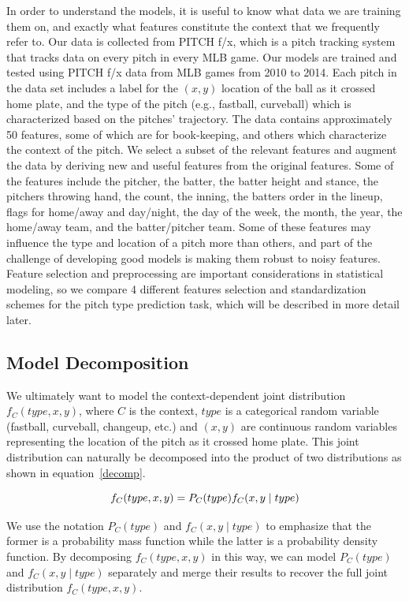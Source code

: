 \documentclass{article}
\begin{document}
In order to understand the models, it is useful to know what data we are training them on, and exactly what features constitute the context that we frequently refer to.  Our data is collected from PITCH f/x, which is a pitch tracking system that tracks data on every pitch in every MLB game. Our models are trained and tested using PITCH f/x data from MLB games from 2010 to 2014. Each pitch in the data set includes a label for the $(x,y)$ location of the ball as it crossed home plate, and the type of the pitch (e.g., fastball, curveball) which is characterized based on the pitches' trajectory.  The data contains approximately 50 features, some of which are for book-keeping, and others which characterize the context of the pitch.  We select a subset of the relevant features and augment the data by deriving new and useful features from the original features.  Some of the features include the pitcher, the batter, the batter height and stance, the pitchers throwing hand, the count, the inning, the batters order in the lineup, flags for home/away and day/night, the day of the week, the month, the year, the home/away team, and the batter/pitcher team.  Some of these features may influence the type and location of a pitch more than others, and part of the challenge of developing good models is making them robust to noisy features.  Feature selection and preprocessing are important considerations in statistical modeling, so we compare 4 different features selection and standardization schemes for the pitch type prediction task, which will be described in more detail later.

\subsection{Model Decomposition}

We ultimately want to model the context-dependent joint distribution $ f_C(type, x, y) $, where $C$ is the context, $ type $ is a categorical random variable (fastball, curveball, changeup, etc.) and $ (x,y) $ are continuous random variables representing the location of the pitch as it crossed home plate.  This joint distribution can naturally be decomposed into the product of two distributions as shown in equation~\ref{decomp}.

\begin{equation} \label{decomp}
f_C(type, x, y) = P_C(type) f_C(x, y \mid type) \\
\end{equation}

We use the notation $ P_C(type) $ and $ f_C(x, y \mid type) $ to emphasize that the former is a probability mass function while the latter is a probability density function.  By decomposing $ f_C(type, x, y) $ in this way, we can model $ P_C(type) $ and $ f_C(x, y \mid type) $ separately and merge their results to recover the full joint distribution $ f_C(type, x, y) $.  
\end{document}
